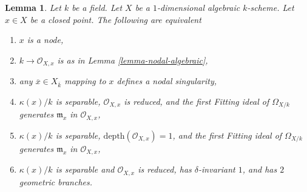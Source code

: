 \documentclass{stacks-project}
\theoremstyle{plain}
\newtheorem{lemma}[subsection]{Lemma}
\theoremstyle{definition}
\theoremstyle{remark}
\numberwithin{equation}{subsection}
\begin{document}
\begin{lemma}
\label{lemma-nodal}
Let $k$ be a field. Let $X$ be a $1$-dimensional algebraic $k$-scheme.
Let $x \in X$ be a closed point. The following are equivalent
\begin{enumerate}
\item $x$ is a node,
\item $k \to \mathcal{O}_{X, x}$ is as in Lemma \ref{lemma-nodal-algebraic},
\item any $\overline{x} \in X_{\overline{k}}$ mapping to $x$ defines
a nodal singularity,
\item $\kappa(x)/k$ is separable, $\mathcal{O}_{X, x}$ is reduced, and
the first Fitting ideal of $\Omega_{X/k}$ generates $\mathfrak m_x$
in $\mathcal{O}_{X, x}$,
\item $\kappa(x)/k$ is separable, $\text{depth}(\mathcal{O}_{X, x}) = 1$, and
the first Fitting ideal of $\Omega_{X/k}$ generates $\mathfrak m_x$
in $\mathcal{O}_{X, x}$,
\item $\kappa(x)/k$ is separable and $\mathcal{O}_{X, x}$ is reduced, has
$\delta$-invariant $1$, and has $2$ geometric branches.
\end{enumerate}
\end{lemma}
\end{document}
